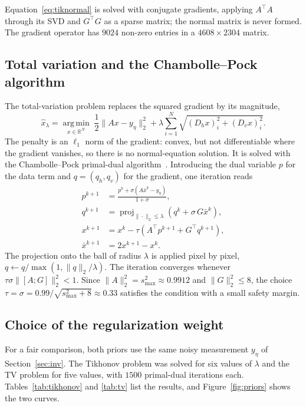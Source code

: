 \documentclass[11pt,a4paper]{article}
\newcommand{\R}{\mathbb{R}}
\newcommand{\argmin}{\operatorname*{arg\,min}}
\newcommand{\T}{\top}
\begin{document}
Equation~\eqref{eq:tiknormal} is solved with conjugate gradients, applying $A^\T A$ through its
SVD and $G^\T G$ as a sparse matrix; the normal matrix is never formed. The gradient operator has
$9024$ non-zero entries in a $4608\times2304$ matrix.

\subsection{Total variation and the Chambolle--Pock algorithm}

The total-variation problem replaces the squared gradient by its magnitude,
\begin{equation}
\hat{x}_\lambda=\argmin_{x\in\R^N}\;
\frac12\|Ax-y_\eta\|_2^2+\lambda\sum_{i=1}^{N}
\sqrt{(D_hx)_i^2+(D_vx)_i^2}.
\label{eq:tvobj}
\end{equation}
The penalty is an $\ell_1$ norm of the gradient: convex, but not differentiable where the
gradient vanishes, so there is no normal-equation solution. It is solved with the
Chambolle--Pock primal-dual algorithm~\cite{chambolle2011}. Introducing the dual variable $p$ for
the data term and $q=(q_h,q_v)$ for the gradient, one iteration reads
\begin{equation}
\begin{aligned}
p^{k+1}&=\frac{p^k+\sigma\left(A\bar{x}^k-y_\eta\right)}{1+\sigma},\\
q^{k+1}&=\operatorname{proj}_{\|\cdot\|_2\le\lambda}
\left(q^k+\sigma\,G\bar{x}^k\right),\\
x^{k+1}&=x^k-\tau\left(A^\T p^{k+1}+G^\T q^{k+1}\right),\\
\bar{x}^{k+1}&=2x^{k+1}-x^k .
\end{aligned}
\label{eq:cp}
\end{equation}
The projection onto the ball of radius $\lambda$ is applied pixel by pixel,
$q\leftarrow q/\max(1,\|q\|_2/\lambda)$. The iteration converges whenever
$\tau\sigma\|[A;G]\|_2^2<1$. Since $\|A\|_2^2=s_{\max}^2\approx0.9912$ and
$\|G\|_2^2\le8$, the choice $\tau=\sigma=0.99/\sqrt{s_{\max}^2+8}\approx0.33$ satisfies the
condition with a small safety margin.

\subsection{Choice of the regularization weight}

For a fair comparison, both priors use the same noisy measurement $y_\eta$ of
Section~\ref{sec:inv}. The Tikhonov problem was solved for six values of $\lambda$ and the TV
problem for five values, with $1500$ primal-dual iterations each. Tables~\ref{tab:tikhonov} and
\ref{tab:tv} list the results, and Figure~\ref{fig:priors} shows the two curves.
\end{document}
